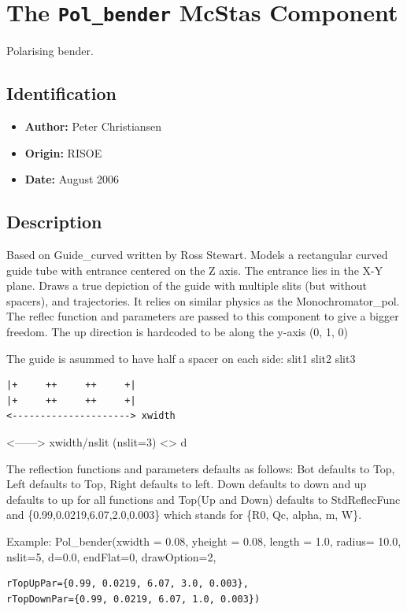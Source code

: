 \section{The \texttt{Pol\_bender} McStas Component}
Polarising bender.

\subsection*{Identification}
\begin{itemize}
  \item \textbf{Author:} Peter Christiansen
  \item \textbf{Origin:} RISOE
  \item \textbf{Date:} August 2006
\end{itemize}

\subsection*{Description}
Based on Guide\_curved written by Ross Stewart. Models a rectangular curved guide tube with entrance centered on the Z axis. The entrance lies in the X-Y plane. Draws a true depiction of the guide with multiple slits (but without spacers), and trajectories. It relies on similar physics as the Monochromator\_pol. The reflec function and parameters are passed to this component to give a bigger freedom. The up direction is hardcoded to be along the y-axis (0, 1, 0)

The guide is asummed to have half a spacer on each side: slit1 slit2 slit3

\begin{verbatim}
|+     ++     ++     +|
|+     ++     ++     +|
<---------------------> xwidth
\end{verbatim}

\textless{}------\textgreater{} xwidth/nslit (nslit=3) \textless{}\textgreater{} d

The reflection functions and parameters defaults as follows: Bot defaults to Top, Left defaults to Top, Right defaults to left. Down defaults to down and up defaults to up for all functions and Top(Up and Down) defaults to StdReflecFunc and \{0.99,0.0219,6.07,2.0,0.003\} which stands for \{R0, Qc, alpha, m, W\}.

Example: Pol\_bender(xwidth = 0.08, yheight = 0.08, length = 1.0, radius= 10.0, nslit=5, d=0.0, endFlat=0, drawOption=2,

\begin{verbatim}
rTopUpPar={0.99, 0.0219, 6.07, 3.0, 0.003},
rTopDownPar={0.99, 0.0219, 6.07, 1.0, 0.003})
\end{verbatim}

